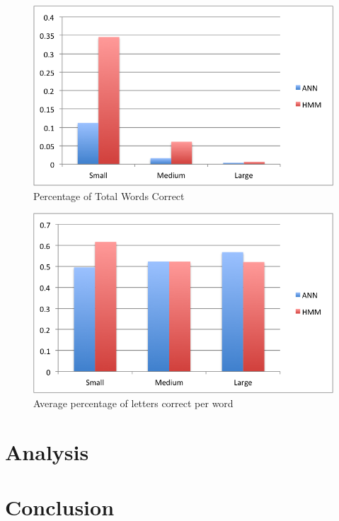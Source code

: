 \documentclass[11pt,a4paper,twocolumn]{article}
\begin{document}
\begin{figure}[h]
\centering
\caption{Percentage of Total Words Correct}
\includegraphics[scale=0.55]{img/wordsCorrect.png}
\end{figure}

\begin{figure}[h]
\centering
\caption{Average percentage of letters correct per word}
\includegraphics[scale=0.55]{img/wordCorrectness.png}
\end{figure}

\section{Analysis}

\section{Conclusion}



\end{document}
